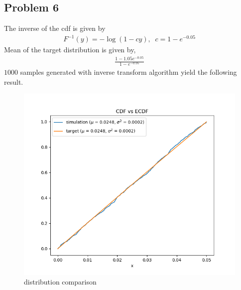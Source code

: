 \documentclass{article}
\begin{document}
\subsection*{Problem 6}
The inverse of the cdf is given by
\begin{align*}
  F^{-1}(y) = -\log(1-cy), \;\; c = 1 - e^{-0.05}
\end{align*}
Mean of the target distribution is given by,
\begin{align*}
  \frac{1-1.05e^{-0.05}}{1-e^{-0.05}}
\end{align*}
$1000$ samples generated with inverse transform algorithm yield the following result.
\begin{figure}[h!]
    \centering
    \includegraphics[width=\linewidth]{../images/p6.png}
    \caption{distribution comparison}
\end{figure}
\newpage
\end{document}
